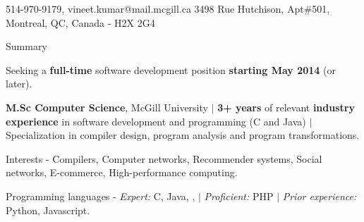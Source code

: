 \documentclass{resume} %
\begin{document}
\begin{hSubsection}{514-970-9179, vineet.kumar@mail.mcgill.ca}
{%
}{3498 Rue Hutchison, Apt\#501, Montreal, QC, Canada - H2X 2G4}
\end{hSubsection}



\begin{rSection}{Summary}
\smallskip
\begin{lSubsection}
\item Seeking a \textbf{full-time} software development position
	\textbf{starting May 2014} (or later).
\item \textbf{M.Sc Computer Science}, McGill University $\vert$
	\textbf{3+ years} of relevant \textbf{industry experience} in software
	 development and programming (C and Java) $\vert$ Specialization in
	 compiler design, program analysis and program transformations.
  \item Interests - Compilers, Computer networks, Recommender systems, Social networks, E-commerce, High-performance computing. 
  \item Programming languages - \emph{Expert:} C, Java, \xten, \matlab
$\vert$ \emph{Proficient:} PHP $\vert$ \emph{Prior experience:} Python, Javascript.	
\end{lSubsection}
\end{rSection}
\end{document}
